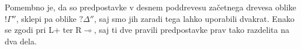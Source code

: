\dol
\begin{prooftree} \footnotesize


\end{prooftree}
Pomembno je, da so predpostavke v desnem poddrevesu začetnega drevesa oblike $!\Gamma''$, sklepi pa oblike $?\Delta''$, saj smo jih zaradi tega lahko uporabili dvakrat. Enako se zgodi pri L+ ter R$\multimap$, saj ti dve pravili predpostavke prav tako razdelita na dva dela.
